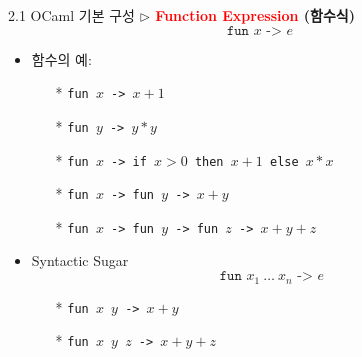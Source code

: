 \documentclass[10pt]{beamer}
\begin{document}
%		
%
%
%
%
	\newpage
	\begin{frame}{2.1 OCaml 기본 구성}
		\textbf{$\triangleright$ \textcolor{red}{Function Expression} (함수식)}
		\[
		\texttt{fun $x$ -> $e$}
		\] 
		\begin{itemize}
			\item 함수의 예:
			\begin{itemize}
				\item[*] \texttt{fun $x$ -> $x+1$}
				\item[*] \texttt{fun $y$ -> $y*y$}
				\item[*] \texttt{fun $x$ -> if $x>0$ then $x+1$ else $x*x$}
				\item[*] \texttt{fun $x$ -> fun $y$ -> $x+y$}
				\item[*] \texttt{fun $x$ -> fun $y$ -> fun $z$ -> $x+y+z$}
			\end{itemize}
			\item[]
			\item Syntactic Sugar \[
			\texttt{fun $x_1\ \dots\ x_n$\ ->\ $e$}
			\]
			\begin{itemize}
				\item[*] \texttt{fun $x$ $y$ -> $x+y$}
				\item[*] \texttt{fun $x$ $y$ $z$ -> $x+y+z$}
			\end{itemize}
		\end{itemize}
	\end{frame}
\end{document}
